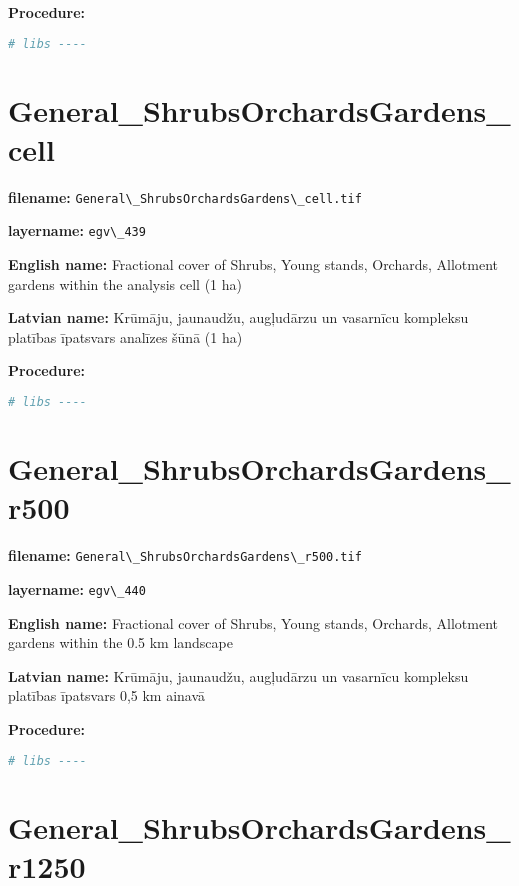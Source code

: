 \documentclass[
]{book}
\newcommand{\passthrough}[1]{#1}
\begin{document}
\textbf{Procedure:}

\begin{lstlisting}[language=R]
# libs ----
\end{lstlisting}

\section{General\_ShrubsOrchardsGardens\_cell}\label{ch06.439}

\textbf{filename:} \passthrough{\lstinline!General\_ShrubsOrchardsGardens\_cell.tif!}

\textbf{layername:} \passthrough{\lstinline!egv\_439!}

\textbf{English name:} Fractional cover of Shrubs, Young stands, Orchards, Allotment gardens within the analysis cell (1 ha)

\textbf{Latvian name:} Krūmāju, jaunaudžu, augļudārzu un vasarnīcu kompleksu platības īpatsvars analīzes šūnā (1 ha)

\textbf{Procedure:}

\begin{lstlisting}[language=R]
# libs ----
\end{lstlisting}

\section{General\_ShrubsOrchardsGardens\_r500}\label{ch06.440}

\textbf{filename:} \passthrough{\lstinline!General\_ShrubsOrchardsGardens\_r500.tif!}

\textbf{layername:} \passthrough{\lstinline!egv\_440!}

\textbf{English name:} Fractional cover of Shrubs, Young stands, Orchards, Allotment gardens within the 0.5 km landscape

\textbf{Latvian name:} Krūmāju, jaunaudžu, augļudārzu un vasarnīcu kompleksu platības īpatsvars 0,5 km ainavā

\textbf{Procedure:}

\begin{lstlisting}[language=R]
# libs ----
\end{lstlisting}

\section{General\_ShrubsOrchardsGardens\_r1250}\label{ch06.441}
\end{document}
